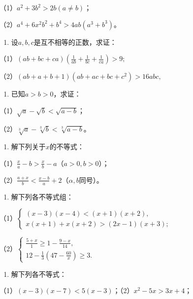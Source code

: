 （1）\(a^2 + 3b^2 > 2b(a \neq b)\)；

（2）\(a^4 + 6x^2b^2 + b^4 > 4ab(a^3 + b^3)\)。

\begin{enumerate}[start=5]
\item
  设\(a, b, c\)是互不相等的正数，求证：
\end{enumerate}

（1）\((ab + bc + ca)\left(\frac{1}{ab} + \frac{1}{bc} + \frac{1}{ca}\right) > 9;\)

（2）\((ab + a + b + 1)(ab + ac + bc + c^2) > 16abc,\)

\begin{enumerate}[start=6]
\item
  已知\(a > b > 0\)，求证：
\end{enumerate}

（1）\(\sqrt{a} - \sqrt{b} < \sqrt{a - b}\)；

（2）\(\sqrt[3]{a} - \sqrt[3]{b} < \sqrt[3]{a - b}\)。

\begin{enumerate}[start=7]
\item
  解下列关于\(x\)的不等式：
\end{enumerate}

（1）\(\frac{x}{a} - b > \frac{x}{b} - a\)（\(a > 0, b > 0\)）；

（2）\(\frac{a + x}{b} < \frac{x - b}{a} + 2\)（\(\alpha, b\)同号）。

\begin{enumerate}[start=8]
\item
  解下列各不等式组：
\end{enumerate}

（1）\(\left\{ \begin{array}{l} (x - 3)(x - 4) < (x + 1)(x + 2), \\ x(x + 1) + x(x + 2) > (2x - 1)(x + 3); \end{array} \right.\)

（2）\(\left\{ \begin{array}{l} \frac{5 + x}{1} \geqslant 1 - \frac{9 - x}{14}, \\ 12 - \frac{1}{3} (47 - \frac{60}{x}) \geqslant 3. \end{array} \right.\)

\begin{enumerate}[start=9]
\item
  解下列各不等式：
\end{enumerate}

（1）\((x - 3)(x - 7) < 5(x - 3)\)；（2）\(x^{2} - 5x > 3x + 4\)；

